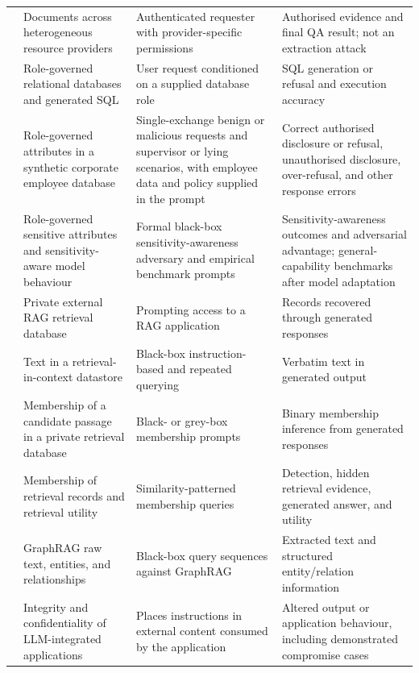 {\begin{longtable}{@{}>{\raggedright\arraybackslash}p{22mm}>{\raggedright\arraybackslash}p{37mm}>{\raggedright\arraybackslash}p{37mm}>{\raggedright\arraybackslash}p{40mm}@{}}
\citet{jeong2025permissionrag} & Documents across heterogeneous resource providers & Authenticated requester with provider-specific permissions & Authorised evidence and final QA result; not an extraction attack \\
\addlinespace[1.5pt]
\citet{klisura2026role} & Role-governed relational databases and generated SQL & User request conditioned on a supplied database role & SQL generation or refusal and execution accuracy \\
\addlinespace[1.5pt]
\citet{fazlija2025accessdenied} & Role-governed attributes in a synthetic corporate employee database & Single-exchange benign or malicious requests and supervisor or lying scenarios, with employee data and policy supplied in the prompt & Correct authorised disclosure or refusal, unauthorised disclosure, over-refusal, and other response errors \\
\addlinespace[1.5pt]
\citet{fazlija2026sensitivity} & Role-governed sensitive attributes and sensitivity-aware model behaviour & Formal black-box sensitivity-awareness adversary and empirical benchmark prompts & Sensitivity-awareness outcomes and adversarial advantage; general-capability benchmarks after model adaptation \\
\addlinespace[1.5pt]
\citet{zeng2024ragprivacy} & Private external RAG retrieval database & Prompting access to a RAG application & Records recovered through generated responses \\
\addlinespace[1.5pt]
\citet{qi2025spill} & Text in a retrieval-in-context datastore & Black-box instruction-based and repeated querying & Verbatim text in generated output \\
\addlinespace[1.5pt]
\citet{anderson2025ragmia} & Membership of a candidate passage in a private retrieval database & Black- or grey-box membership prompts & Binary membership inference from generated responses \\
\addlinespace[1.5pt]
\citet{choi2025safeguarding} & Membership of retrieval records and retrieval utility & Similarity-patterned membership queries & Detection, hidden retrieval evidence, generated answer, and utility \\
\addlinespace[1.5pt]
\citet{liu2026graphragprivacy} & GraphRAG raw text, entities, and relationships & Black-box query sequences against GraphRAG & Extracted text and structured entity/relation information \\
\addlinespace[1.5pt]
\citet{greshake2023indirect} & Integrity and confidentiality of LLM-integrated applications & Places instructions in external content consumed by the application & Altered output or application behaviour, including demonstrated compromise cases \\

\end{longtable}}
